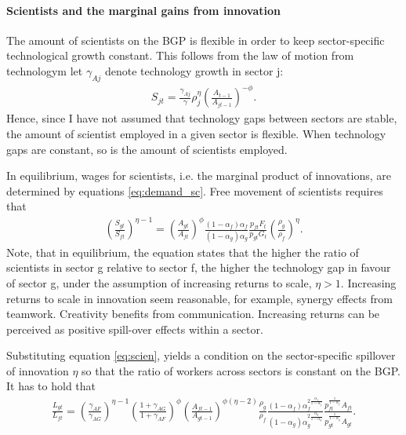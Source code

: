 \paragraph{Scientists and the marginal gains from innovation}
The amount of scientists on the BGP is flexible in order to keep sector-specific technological growth constant. This follows from the law of motion from technologym let $\gamma_{Aj}$ denote technology growth in sector j:
\begin{align}
S_{jt}=\frac{\gamma_{Aj}}{\gamma}\rho_j^\eta\left(\frac{A_{t-1}}{A_{jt-1}}\right)^{-\phi}. \label{eq:scien}
\end{align}
Hence, since I have not assumed that technology gaps between sectors are stable, the amount of scientist employed in a given sector is flexible. When technology gaps are constant, so is the amount of scientists employed.

In equilibrium, wages for scientists, i.e. the marginal product of innovations, are determined by equations \ref{eq:demand_sc}. 
Free movement of scientists requires that
\begin{align}
\left(\frac{S_{gt}}{S_{ft}}\right)^{\eta-1}=\left(\frac{A_{gt}}{A_{ft}}\right)^\phi \frac{(1-\alpha_f)\alpha_f}{(1-\alpha_g)\alpha_g}\frac{p_{ft}F_t}{p_{gt}G_t}\left(\frac{\rho_g}{\rho_f}\right)^\eta.
\end{align}
Note, that in equilibrium, the equation states that the higher the ratio of scientists in sector g relative to sector f, the higher the technology gap in favour of sector g, under the assumption of increasing returns to scale, $\eta>1$. Increasing returns to scale in innovation seem reasonable, for example, synergy effects from teamwork. Creativity benefits from communication. Increasing returns can be perceived as positive spill-over effects within a sector. 


Substituting equation \ref{eq:scien}, yields a condition on the sector-specific spillover of innovation $\eta$ so that the ratio of workers across sectors is constant on the BGP.
It has to hold that
\begin{align}
\frac{L_{gt}}{L_{ft}}= \left(\frac{\gamma_{AF}}{\gamma_{AG}}\right)^{\eta-1}\left(\frac{1+\gamma_{AG}}{1+\gamma_{AF}}\right)^\phi \left(\frac{A_{ft-1}}{A_{gt-1}}\right)^{\phi(\eta-2)}\frac{\rho_g}{\rho_f}\frac{(1-\alpha_f)\alpha_f^{2\frac{\alpha_f}{1-\alpha_f}}}{(1-\alpha_g)\alpha_g^{2\frac{\alpha_g}{1-\alpha_g}}}\frac{p_{ft}^\frac{1}{1-\alpha_f}A_{ft}}{p_{gt}^\frac{1}{1-\alpha_g}A_{gt}}.
\end{align}

